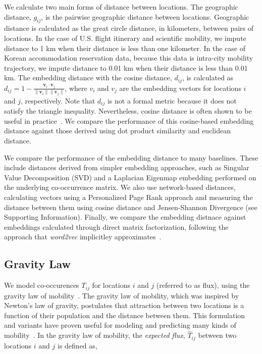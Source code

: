 \documentclass[12pt]{article} %
\def\SI{Supporting Information}
\begin{document}
We calculate two main forms of distance between locations.
The geographic distance, $g_{ij}$, is the pairwise geographic distance between locations.
Geographic distance is calculated as the great circle distance, in kilometers, between pairs of locations.
In the case of U.S. flight itinerary and scientific mobility, we impute distance to 1 km when their distance is less than one kilometer.
In the case of Korean accommodation reservation data, because this data is intra-city mobility trajectory, we impute distance to 0.01 km when their distance is less than 0.01 km.
The embedding distance with the cosine distance, $d_{ij}$, is calculated as $d_{ij} = 1 - \frac{\bm{v}_{i} \cdot \bm{v}_{j}}{\lVert \bm{v}_{i} \rVert \lVert \bm{v}_{j} \rVert}$,
where $v_i$ and $v_j$ are the embedding vectors for locations $i$ and $j$, respectively.
Note that $d_{ij}$ is not a formal metric because it does not satisfy the triangle inequality.
Nevertheless, cosine distance is often shown to be useful in practice~\autocite{lerman2007embedding, brown1970migration, kim2018functional}.
We compare the performance of this cosine-based embedding distance against those derived using dot product similarity and euclidean distance.

We compare the performance of the embedding distance to many baselines.
These include distances derived from simpler embedding approaches, such as Singular Value Decomposition (SVD) and a Laplacian Eigenmap embedding performed on the underlying co-occurrence matrix.
We also use network-based distances, calculating vectors using a Personalized Page Rank approach and measuring the distance between them using cosine distance and Jensen-Shannon Divergence (see \SI).
Finally, we compare the embedding distnace against embeddings calculated through direct matrix factorization, following the approach that \textit{word2vec} implicitley approximates~\cite{levy2014neural}.


%
%
\subsection*{Gravity Law}

We model co-occurences $T_{ij}$ for locations $i$ and $j$ (referred to as flux), using the gravity law of mobility~\autocite{zipf1946gravity}.
The gravity law of mobility, which was inspired by Newton's law of gravity, postulates that attraction between two locations is a function of their population and the distance between them.
This formulation and variants have proven useful for modeling and predicting many kinds of mobility~\autocite{jung2008highwaygravity, curiel2018citygravity, truscott2012epidemicgravity, hong2016busgravity}.
In the gravity law of mobility, the \textit{expected flux}, $\hat{T}_{ij}$ between two locations $i$ and $j$ is defined as,
\end{document}
